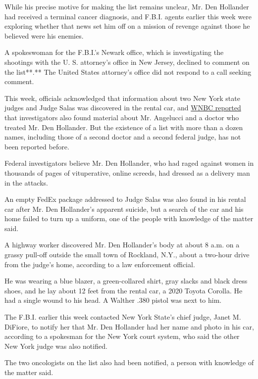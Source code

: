 While his precise motive for making the list remains unclear, Mr. Den
Hollander had received a terminal cancer diagnosis, and F.B.I. agents
earlier this week were exploring whether that news set him off on a
mission of revenge against those he believed were his enemies.

A spokeswoman for the F.B.I.'s Newark office, which is investigating the
shootings with the U. S. attorney's office in New Jersey, declined to
comment on the list**.** The United States attorney's office did not
respond to a call seeking comment.

This week, officials acknowledged that information about two New York
state judges and Judge Salas was discovered in the rental car, and
\href{https://www.nbcnewyork.com/news/local/crime-and-courts/fbi-says-it-has-evidence-linking-nj-judge-family-shooting-suspect-to-calif-murder/2526223/}{WNBC
reported} that investigators also found material about Mr. Angelucci and
a doctor who treated Mr. Den Hollander. But the existence of a list with
more than a dozen names, including those of a second doctor and a second
federal judge, has not been reported before.

Federal investigators believe Mr. Den Hollander, who had raged against
women in thousands of pages of vituperative, online screeds, had dressed
as a delivery man in the attacks.

An empty FedEx package addressed to Judge Salas was also found in his
rental car after Mr. Den Hollander's apparent suicide, but a search of
the car and his home failed to turn up a uniform, one of the people with
knowledge of the matter said.

A highway worker discovered Mr. Den Hollander's body at about 8 a.m. on
a grassy pull-off outside the small town of Rockland, N.Y., about a
two-hour drive from the judge's home, according to a law enforcement
official.

He was wearing a blue blazer, a green-collared shirt, gray slacks and
black dress shoes, and he lay about 12 feet from the rental car, a 2020
Toyota Corolla. He had a single wound to his head. A Walther .380 pistol
was next to him.

The F.B.I. earlier this week contacted New York State's chief judge,
Janet M. DiFiore, to notify her that Mr. Den Hollander had her name and
photo in his car, according to a spokesman for the New York court
system, who said the other New York judge was also notified.

The two oncologists on the list also had been notified, a person with
knowledge of the matter said.

